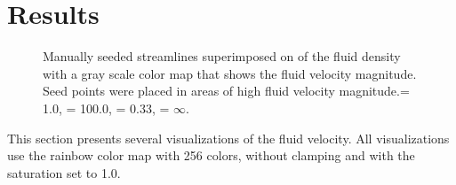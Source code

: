 \section{Results}
\label{s:streamlines:results}
%
\begin{figure}
	\centering
	\begin{subfigure}{0.5\textwidth}
		\centering
	\end{subfigure}			
	\caption{Manually seeded streamlines superimposed on \smoke of the fluid density with a gray scale color map that shows the fluid velocity magnitude. Seed points were placed in areas of high fluid velocity magnitude.\timeStep = 1.0, \timeStepMax = 100.0, \edgeLength = 0.33, \edgeLengthMax = $\infty$.}
	\label{fig:streamlines:results:manuallySeed}
\end{figure}

This section presents several visualizations of the fluid velocity. All visualizations use the rainbow color map with 256 colors, without clamping and with the saturation set to 1.0.

